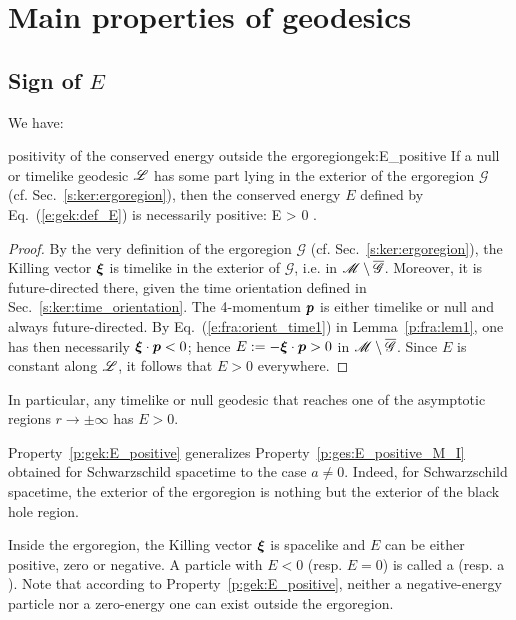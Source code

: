 
\section{Main properties of geodesics} \label{s:ges:general_prop}

\subsection{Sign of \texorpdfstring{$E$}{E}} \label{s:gek:sign_E}

We have:
\begin{tprop}{positivity of the conserved energy outside the ergoregion}{gek:E_positive}
If a null or timelike geodesic $\mathscr{L}$ has some part lying in the exterior of the ergoregion $\mathscr{G}$ (cf. Sec.~\ref{s:ker:ergoregion}),
then the conserved energy $E$ defined by Eq.~(\ref{e:gek:def_E}) is necessarily
positive:
\be \label{e:gek:E_positive}
    \Li \not\subset {}\quad \Longrightarrow \quad E > 0 .
\ee
\end{tprop}

\begin{proof}
By the very definition of the ergoregion $\mathscr{G}$ (cf. Sec.~\ref{s:ker:ergoregion}),
the Killing vector $\bm{\xi}$ is timelike in the exterior of $\mathscr{G}$, i.e.
in $\mathscr{M}\setminus\overline{\mathscr{G}}$. Moreover, it is
future-directed there, given the time orientation defined in Sec.~\ref{s:ker:time_orientation}.
The 4-momentum $\bm{p}$ is either timelike or null and always future-directed.
By Eq.~(\ref{e:fra:orient_time1}) in Lemma~\ref{p:fra:lem1}, one has then necessarily $\bm{\xi}\cdot\bm{p} < 0$; hence
$E := - \bm{\xi}\cdot\bm{p} > 0$ in $\mathscr{M}\setminus \overline{\mathscr{G}}$. Since $E$ is constant along $\mathscr{L}$, it
follows that $E > 0$ everywhere.
\end{proof}
In particular, any timelike or null geodesic that reaches one of the asymptotic regions
$r\to\pm\infty$ has $E>0$.
\begin{remark}
Property~\ref{p:gek:E_positive} generalizes Property~\ref{p:ges:E_positive_M_I}
obtained for Schwarzschild spacetime to
the case $a\not=0$. Indeed, for Schwarzschild spacetime, the exterior of the ergoregion
is nothing but the exterior of the black hole region.
\end{remark}

Inside the ergoregion, the Killing vector $\bm{\xi}$ is spacelike and $E$ can be
either positive, zero or negative.
A particle with $E<0$ (resp. $E=0$) is called a
(resp. a ).
Note that according to Property~\ref{p:gek:E_positive}, neither a negative-energy particle nor a zero-energy one can exist outside the ergoregion.


